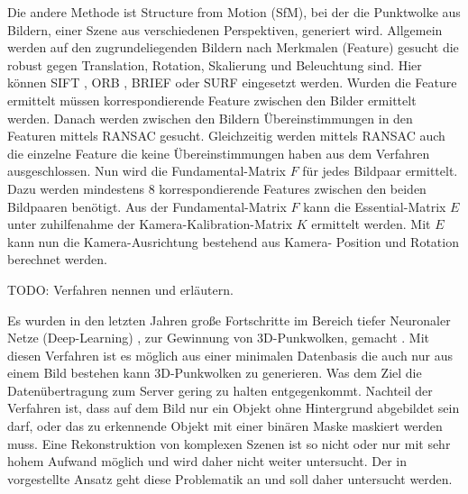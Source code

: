 \documentclass[12pt,titlepage, twoside]{article}
\begin{document}
Die andere Methode ist Structure from Motion (SfM), bei der die Punktwolke aus Bildern, einer Szene aus verschiedenen Perspektiven, generiert wird. 
Allgemein werden auf den zugrundeliegenden Bildern nach Merkmalen (Feature) gesucht die robust gegen Translation, Rotation, Skalierung und Beleuchtung sind. 
Hier können SIFT \cite{Sift}, ORB \cite{ORB}, BRIEF \cite{BRIEF} oder SURF \cite{SURF} eingesetzt werden.
Wurden die Feature ermittelt müssen korrespondierende Feature zwischen den Bilder ermittelt werden. 
Danach werden zwischen den Bildern Übereinstimmungen in den Featuren mittels RANSAC gesucht. Gleichzeitig werden mittels RANSAC auch die einzelne Feature die keine Übereinstimmungen haben aus dem Verfahren ausgeschlossen.
Nun wird die Fundamental-Matrix $F$ für jedes Bildpaar ermittelt. Dazu werden mindestens 8 korrespondierende Features zwischen den beiden Bildpaaren benötigt. 
Aus der Fundamental-Matrix $F$ kann die Essential-Matrix $E$ unter zuhilfenahme der Kamera-Kalibration-Matrix $K$ ermittelt werden. 
Mit $E$ kann nun die Kamera-Ausrichtung bestehend aus Kamera- Position und Rotation berechnet werden.



TODO: Verfahren nennen und erläutern.

Es wurden in den letzten Jahren große Fortschritte im Bereich tiefer Neuronaler Netze (Deep-Learning) \cite{lecun2015deep}, zur Gewinnung von 3D-Punkwolken, gemacht \cite{fan2016point} \cite{tatarchenko2017octree} \cite{wang2018pixel2mesh}. 
Mit diesen Verfahren ist es möglich aus einer minimalen Datenbasis die auch nur aus einem Bild bestehen kann 3D-Punkwolken zu generieren. Was dem Ziel die Datenübertragung zum Server gering zu halten entgegenkommt.
Nachteil der Verfahren ist, dass auf dem Bild nur ein Objekt ohne Hintergrund abgebildet sein darf, oder das zu erkennende Objekt mit einer binären Maske maskiert werden muss.
Eine Rekonstruktion von komplexen Szenen ist so nicht oder nur mit sehr hohem Aufwand möglich \cite{rs11222644} und wird daher nicht weiter untersucht. 
Der in \cite{rs11222644} vorgestellte Ansatz geht diese Problematik an und soll daher untersucht werden.
\end{document}
